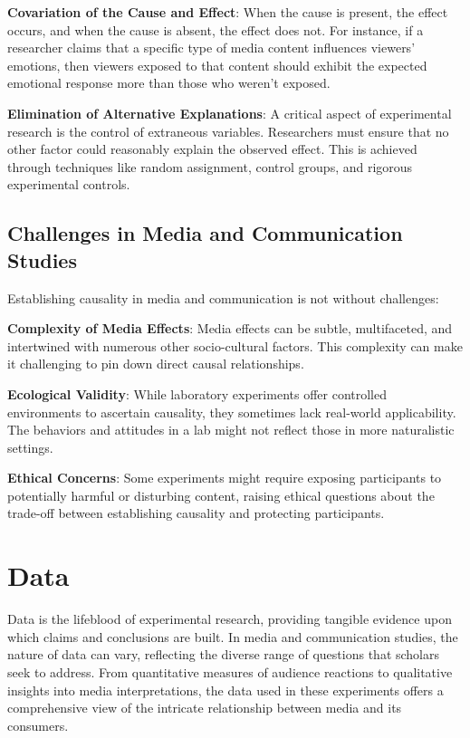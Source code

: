 \documentclass[
  b5paper]{book}
\begin{document}
\textbf{Covariation of the Cause and Effect}: When the cause is present, the effect occurs, and when the cause is absent, the effect does not. For instance, if a researcher claims that a specific type of media content influences viewers' emotions, then viewers exposed to that content should exhibit the expected emotional response more than those who weren't exposed.

\textbf{Elimination of Alternative Explanations}: A critical aspect of experimental research is the control of extraneous variables. Researchers must ensure that no other factor could reasonably explain the observed effect. This is achieved through techniques like random assignment, control groups, and rigorous experimental controls.

\hypertarget{challenges-in-media-and-communication-studies}{%
\subsection*{Challenges in Media and Communication Studies}\label{challenges-in-media-and-communication-studies}}

Establishing causality in media and communication is not without challenges:

\textbf{Complexity of Media Effects}: Media effects can be subtle, multifaceted, and intertwined with numerous other socio-cultural factors. This complexity can make it challenging to pin down direct causal relationships.

\textbf{Ecological Validity}: While laboratory experiments offer controlled environments to ascertain causality, they sometimes lack real-world applicability. The behaviors and attitudes in a lab might not reflect those in more naturalistic settings.

\textbf{Ethical Concerns}: Some experiments might require exposing participants to potentially harmful or disturbing content, raising ethical questions about the trade-off between establishing causality and protecting participants.

\hypertarget{data}{%
\section{Data}\label{data}}

Data is the lifeblood of experimental research, providing tangible evidence upon which claims and conclusions are built. In media and communication studies, the nature of data can vary, reflecting the diverse range of questions that scholars seek to address. From quantitative measures of audience reactions to qualitative insights into media interpretations, the data used in these experiments offers a comprehensive view of the intricate relationship between media and its consumers.
\end{document}
